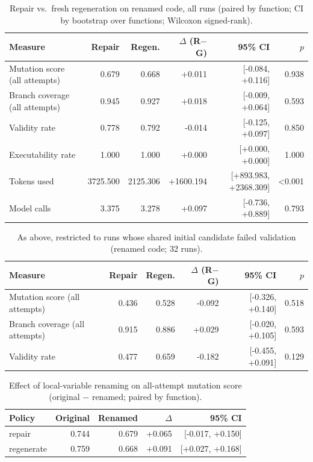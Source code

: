 \begin{table}[t]
\centering\small
\caption{Repair vs.\ fresh regeneration on renamed code, all runs (paired by function; CI by bootstrap over functions; Wilcoxon signed-rank).}
\label{tab:main-renamed}
\begin{tabular}{lrrrrr}
\toprule
Measure & Repair & Regen. & $\Delta$ (R$-$G) & 95\% CI & $p$ \\
\midrule
Mutation score (all attempts) & 0.679 & 0.668 & +0.011 & [-0.084, +0.116] & 0.938 \\
Branch coverage (all attempts) & 0.945 & 0.927 & +0.018 & [-0.009, +0.064] & 0.593 \\
Validity rate & 0.778 & 0.792 & -0.014 & [-0.125, +0.097] & 0.850 \\
Executability rate & 1.000 & 1.000 & +0.000 & [+0.000, +0.000] & 1.000 \\
Tokens used & 3725.500 & 2125.306 & +1600.194 & [+893.983, +2368.309] & <0.001 \\
Model calls & 3.375 & 3.278 & +0.097 & [-0.736, +0.889] & 0.793 \\
\bottomrule
\end{tabular}
\end{table}

\begin{table}[t]
\centering\small
\caption{As above, restricted to runs whose shared initial candidate failed validation (renamed code; 32 runs).}
\label{tab:fail-renamed}
\begin{tabular}{lrrrrr}
\toprule
Measure & Repair & Regen. & $\Delta$ (R$-$G) & 95\% CI & $p$ \\
\midrule
Mutation score (all attempts) & 0.436 & 0.528 & -0.092 & [-0.326, +0.140] & 0.518 \\
Branch coverage (all attempts) & 0.915 & 0.886 & +0.029 & [-0.020, +0.105] & 0.593 \\
Validity rate & 0.477 & 0.659 & -0.182 & [-0.455, +0.091] & 0.129 \\
\bottomrule
\end{tabular}
\end{table}

\begin{table}[t]
\centering\small
\caption{Effect of local-variable renaming on all-attempt mutation score (original $-$ renamed; paired by function).}
\label{tab:rename}
\begin{tabular}{lrrrr}
\toprule
Policy & Original & Renamed & $\Delta$ & 95\% CI \\
\midrule
repair & 0.744 & 0.679 & +0.065 & [-0.017, +0.150] \\
regenerate & 0.759 & 0.668 & +0.091 & [+0.027, +0.168] \\
\bottomrule
\end{tabular}
\end{table}

